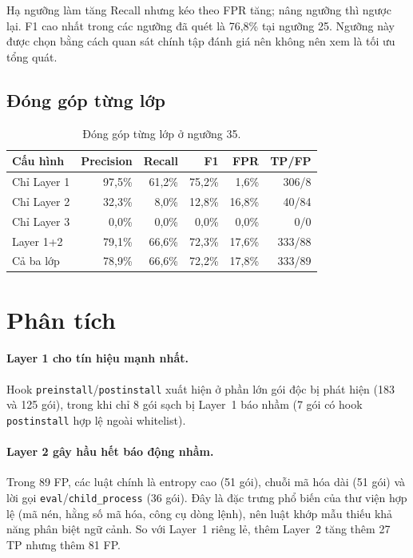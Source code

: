 \documentclass[12pt,a4paper]{article}
\begin{document}
Hạ ngưỡng làm tăng Recall nhưng kéo theo FPR tăng; nâng ngưỡng thì ngược lại. F1 cao nhất trong các ngưỡng đã quét là 76{,}8\% tại ngưỡng 25. Ngưỡng này được chọn bằng cách quan sát chính tập đánh giá nên không nên xem là tối ưu tổng quát.

\subsection{Đóng góp từng lớp}
\begin{table}[H]
\centering
\begin{tabular}{lrrrrr}
\toprule
Cấu hình & Precision & Recall & F1 & FPR & TP/FP \\
\midrule
Chỉ Layer 1 & 97{,}5\% & 61{,}2\% & 75{,}2\% & 1{,}6\% & 306/8 \\
Chỉ Layer 2 & 32{,}3\% & 8{,}0\%  & 12{,}8\% & 16{,}8\% & 40/84 \\
Chỉ Layer 3 & 0{,}0\%  & 0{,}0\%  & 0{,}0\%  & 0{,}0\%  & 0/0 \\
Layer 1+2   & 79{,}1\% & 66{,}6\% & 72{,}3\% & 17{,}6\% & 333/88 \\
Cả ba lớp   & 78{,}9\% & 66{,}6\% & 72{,}2\% & 17{,}8\% & 333/89 \\
\bottomrule
\end{tabular}
\caption{Đóng góp từng lớp ở ngưỡng 35.}
\end{table}

\section{Phân tích}
\paragraph{Layer 1 cho tín hiệu mạnh nhất.} Hook \texttt{preinstall}/\texttt{postinstall} xuất hiện ở phần lớn gói độc bị phát hiện (183 và 125 gói), trong khi chỉ 8 gói sạch bị Layer~1 báo nhầm (7 gói có hook \texttt{postinstall} hợp lệ ngoài whitelist).

\paragraph{Layer 2 gây hầu hết báo động nhầm.} Trong 89 FP, các luật chính là entropy cao (51 gói), chuỗi mã hóa dài (51 gói) và lời gọi \texttt{eval}/\texttt{child\_process} (36 gói). Đây là đặc trưng phổ biến của thư viện hợp lệ (mã nén, hằng số mã hóa, công cụ dòng lệnh), nên luật khớp mẫu thiếu khả năng phân biệt ngữ cảnh. So với Layer~1 riêng lẻ, thêm Layer~2 tăng thêm 27 TP nhưng thêm 81 FP.
\end{document}
